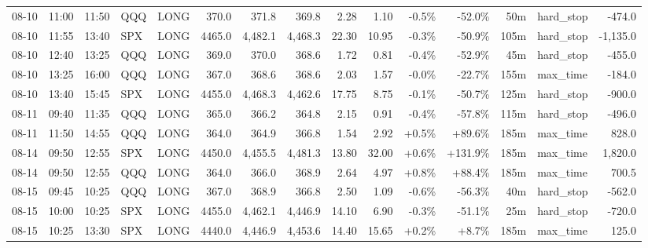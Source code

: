 \documentclass[11pt,a4paper,twoside]{article}
\begin{document}
\begin{landscape}
\begin{center}
\begin{longtable}{>{\color{txtmain}}l l l l l r r r r r r r r >{\color{txtmain}}l r}
08-10 & 11:00 & 11:50 & QQQ & LONG & 370.0 & 371.8 & 369.8 & 2.28 & 1.10 & \textcolor{lossred}{-0.5\%} & \textcolor{lossred}{-52.0\%} & 50m & hard\_stop & \textcolor{lossred}{-474.0} \\
08-10 & 11:55 & 13:40 & SPX & LONG & 4465.0 & 4,482.1 & 4,468.3 & 22.30 & 10.95 & \textcolor{lossred}{-0.3\%} & \textcolor{lossred}{-50.9\%} & 105m & hard\_stop & \textcolor{lossred}{-1,135.0} \\
08-10 & 12:40 & 13:25 & QQQ & LONG & 369.0 & 370.0 & 368.6 & 1.72 & 0.81 & \textcolor{lossred}{-0.4\%} & \textcolor{lossred}{-52.9\%} & 45m & hard\_stop & \textcolor{lossred}{-455.0} \\
08-10 & 13:25 & 16:00 & QQQ & LONG & 367.0 & 368.6 & 368.6 & 2.03 & 1.57 & \textcolor{lossred}{-0.0\%} & \textcolor{lossred}{-22.7\%} & 155m & max\_time & \textcolor{lossred}{-184.0} \\
08-10 & 13:40 & 15:45 & SPX & LONG & 4455.0 & 4,468.3 & 4,462.6 & 17.75 & 8.75 & \textcolor{lossred}{-0.1\%} & \textcolor{lossred}{-50.7\%} & 125m & hard\_stop & \textcolor{lossred}{-900.0} \\
08-11 & 09:40 & 11:35 & QQQ & LONG & 365.0 & 366.2 & 364.8 & 2.15 & 0.91 & \textcolor{lossred}{-0.4\%} & \textcolor{lossred}{-57.8\%} & 115m & hard\_stop & \textcolor{lossred}{-496.0} \\
08-11 & 11:50 & 14:55 & QQQ & LONG & 364.0 & 364.9 & 366.8 & 1.54 & 2.92 & \textcolor{wingreen}{+0.5\%} & \textcolor{wingreen}{+89.6\%} & 185m & max\_time & \textcolor{wingreen}{828.0} \\
08-14 & 09:50 & 12:55 & SPX & LONG & 4450.0 & 4,455.5 & 4,481.3 & 13.80 & 32.00 & \textcolor{wingreen}{+0.6\%} & \textcolor{wingreen}{+131.9\%} & 185m & max\_time & \textcolor{wingreen}{1,820.0} \\
08-14 & 09:50 & 12:55 & QQQ & LONG & 364.0 & 366.0 & 368.9 & 2.64 & 4.97 & \textcolor{wingreen}{+0.8\%} & \textcolor{wingreen}{+88.4\%} & 185m & max\_time & \textcolor{wingreen}{700.5} \\
08-15 & 09:45 & 10:25 & QQQ & LONG & 367.0 & 368.9 & 366.8 & 2.50 & 1.09 & \textcolor{lossred}{-0.6\%} & \textcolor{lossred}{-56.3\%} & 40m & hard\_stop & \textcolor{lossred}{-562.0} \\
08-15 & 10:00 & 10:25 & SPX & LONG & 4455.0 & 4,462.1 & 4,446.9 & 14.10 & 6.90 & \textcolor{lossred}{-0.3\%} & \textcolor{lossred}{-51.1\%} & 25m & hard\_stop & \textcolor{lossred}{-720.0} \\
08-15 & 10:25 & 13:30 & SPX & LONG & 4440.0 & 4,446.9 & 4,453.6 & 14.40 & 15.65 & \textcolor{wingreen}{+0.2\%} & \textcolor{wingreen}{+8.7\%} & 185m & max\_time & \textcolor{wingreen}{125.0} \\

\end{longtable}
\end{center}
\end{landscape}
\end{document}
